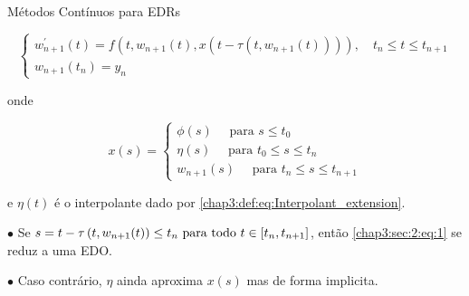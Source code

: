 \documentclass{beamer}
\theoremstyle{plain}
\theoremstyle{definition}
\begin{document}

\begin{frame}{Métodos Contínuos para EDRs}

    \footnotesize

    \begin{equation}
        \left\{\begin{array}{l}
                w_{n+1}^{\prime}(t)=f(t, w_{n+1}(t), x(t-\tau(t, w_{n+1}(t)))), \quad t_{n} \leq t \leq t_{n+1} \\
                w_{n+1}(t_{n})=y_{n}
        \end{array}\right.
        \label{chap3:sec:2:eq:1}
    \end{equation}

    onde

    $$
    x(s)=\left\{\begin{array}{l}
            \phi(s) \quad \text { para } s \leq t_{0} \\
            \eta(s) \quad \text { para } t_{0} \leq s \leq t_{n} \\
            w_{n+1}(s) \quad \text { para } t_{n} \leq s \leq t_{n+1}
    \end{array}\right.
    $$

    e \(\eta(t)\) é o interpolante dado por \ref{chap3:def:eq:Interpolant_extension}. 

    \phantom{aa} $\bullet$ Se \( s=t-\tau\left(t, w_{n+1}(t)\right) \leq t_{n}$ para todo $t \in\left[t_{n}, t_{n+1}\right]\), então \eqref{chap3:sec:2:eq:1} se reduz a uma EDO.
    
    \phantom{aa} $\bullet$ Caso contrário, $\eta$ ainda aproxima $x(s)$ mas de forma implicita.
\end{frame}


\end{document}
